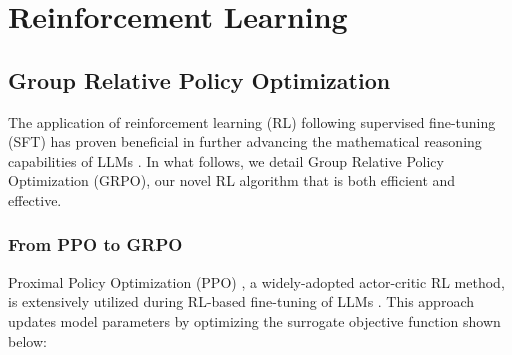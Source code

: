\section{Reinforcement Learning}

\subsection{Group Relative Policy Optimization} The application of reinforcement learning (RL) following supervised fine-tuning (SFT) has proven beneficial in further advancing the mathematical reasoning capabilities of LLMs \citep{wang2023math,wizardmath}. In what follows, we detail Group Relative Policy Optimization (GRPO), our novel RL algorithm that is both efficient and effective.

\subsubsection{From PPO to GRPO} Proximal Policy Optimization (PPO) \citep{schulman2017proximal}, a widely-adopted actor-critic RL method, is extensively utilized during RL-based fine-tuning of LLMs \citep{ouyang2022training}. This approach updates model parameters by optimizing the surrogate objective function shown below:

